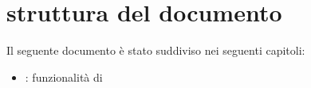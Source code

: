 %
%
\section[Struttura del documento]{struttura del documento}
\label{abs-document-structure}
Il seguente documento è stato suddiviso nei seguenti capitoli:

\begin{itemize}
\item{: funzionalità di }
\end{itemize}